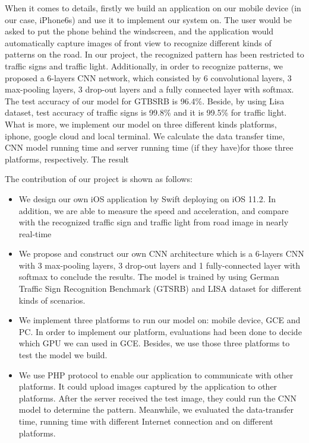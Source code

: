 \documentclass[conference]{IEEEtran}
\begin{document}
When it comes to details, firstly we build an application on our mobile device (in our case, iPhone6s) and use it to implement our system on. The user would be asked to put the phone behind the windscreen, and the application would automatically capture images of front view to recognize different kinds of patterns on the road. In our project, the recognized pattern has been restricted to traffic signs and traffic light. Additionally, in order to recognize patterns, we proposed a 6-layers CNN network, which consisted by 6 convolutional layers, 3 max-pooling layers, 3 drop-out layers and a fully connected layer with softmax. The test accuracy of our model for GTBSRB is 96.4\%.  Beside, by using Lisa dataset, test accuracy of traffic signs is 99.8\% and it is 99.5\% for traffic light. What is more, we implement our model on three different kinds platforms, iphone, google cloud and local terminal. We calculate the data transfer time, CNN model running time and server running time (if they have)for those three platforms, respectively. The result


The contribution of our project is shown as follows: 

\begin{itemize}
  \item We design our own iOS application by Swift deploying on iOS 11.2. In addition, we are able to measure the speed and acceleration, and compare with the recognized traffic sign and traffic light from road image in nearly real-time 
  \item We propose and construct our own CNN architecture which is a 6-layers CNN with 3 max-pooling layers, 3 drop-out layers and 1 fully-connected layer with softmax to conclude the results. The model is trained by using German Traffic Sign Recognition Benchmark (GTSRB) and LISA dataset for different kinds of scenarios.
  \item We implement three platforms to run our model on: mobile device, GCE and PC. In order to implement our platform, evaluations had been done to decide which GPU we can used in GCE. Besides, we use those three platforms to test the model we build.
  \item  We use PHP protocol to enable our application to communicate with other platforms. It could upload images captured by the application to other platforms. After the server received the test image, they could run the CNN model to determine the pattern. Meanwhile, we evaluated the data-transfer time, running time with different Internet connection and on different platforms.
\end{itemize}
\end{document}
